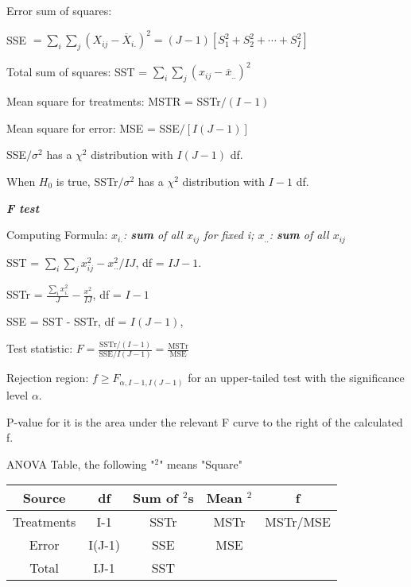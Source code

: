 \documentclass{article}
\newcommand{\smalltitle}[1]{
	\noindent
	\textbf{\textit{#1}}
}
\begin{document}
	Error sum of squares: 
	
	SSE $= \sum _ { i } \sum _ { j } \left( X _ { i j } - \overline { X } _ { i . } \right) ^ { 2 } = ( J - 1 ) \left[ S _ { 1 } ^ { 2 } + S _ { 2 } ^ { 2 } + \cdots + S _ { I } ^ { 2 } \right]$
	
	Total sum of squares: 
	SST = $\sum _ { i } \sum _ { j } \left( x _ { i j } - \overline { x } _ { . . } \right) ^ { 2 }$
	
	Mean square for treatments: MSTR = SSTr$/(I - 1)$
	
	Mean square for error: MSE = SSE$/[I(J-1)]$
	
	SSE$/\sigma^2$ has a $\chi^2$ distribution with $I(J-1)$ df. 
	
	
	When $H_0$ is true, SSTr$/\sigma^2$ has a $\chi^2$ distribution with $I-1$ df.
	
	
	\smalltitle{F test}
	
	Computing Formula: \textit{$x_{i.}$: \textbf{sum} of all $x_{ij}$ for fixed i; $x_{..}$: \textbf{sum} of all $x_{ij}$}
	
	SST = $\sum _ { i } \sum _ { j } x _ { i j } ^ { 2 } - x _ { . . } ^ { 2 } / I J$, df = $IJ-1$.
	
	SSTr = $\frac { \sum _ { i } x _ { i . } ^ { 2 } } { J } - \frac { x ^ { 2 } _ {..} } { I J }$, df = $I-1$
	
	SSE = SST - SSTr, df = $I(J-1)$, 
	
	Test statistic: $F = \frac {   { \mathrm { SSTr } } {  } / ( I - 1 ) } {  \mathrm { SSE }  / I ( J - 1 ) } = \frac{\mathrm{ MSTr }}{\mathrm{ MSE }}$
	
	
	Rejection region: $f\geq F_{\alpha,I-1,I(J-1)}$ for an upper-tailed test with the significance level $\alpha$.
	
	P-value for it is the area under the relevant F curve to the right of the calculated f.
	
	
	ANOVA Table, the following "$^2$" means "Square"
	
	
	\begin{table}[htb]
		\vspace{-2ex}
		\centering
		\begin{tabular}{ccccc}
			\hline
			Source & df     & Sum of $^2$s & Mean $^2$ & f        \\\hline
			Treatments         & I-1    & SSTr           & MSTr        & MSTr/MSE \\
			Error              & I(J-1) & SSE            & MSE         &          \\
			Total              & IJ-1   & SST            &             &         \\
			\hline
		\end{tabular}
	\vspace{-1em}
	\end{table}
	
\end{document}
